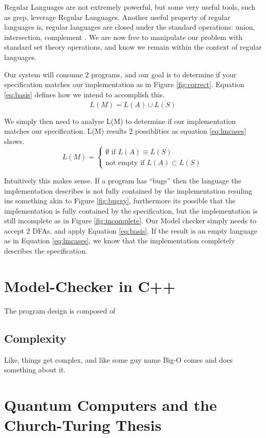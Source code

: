 \documentclass[12pt,journal,compsoc,draftcls]{IEEEtran}
\begin{document}
Regular Languages are not extremely powerful, but some very useful tools,
such as grep, leverage Regular Languages. Another useful property of regular
languages is, regular languages are closed under the standard operations: union,
intersection, complement \cite[p.~45]{Sipser}.  We are now free to manipulate
our problem with standard set theory operations, and know we remain within the
context of regular languages.  

Our system will consume 2 programs, and our goal is to determine if your
specification matches our implementation as in Figure \ref{fig:correct}.
Equation \ref{eq:basis} defines how we intend to accomplish this. 
\begin{equation}
L( M ) = L( A ) \cup \overline{L ( S ) } 
\label{eq:basis}
\end{equation}

We simply then need to analyse L(M) to determine if our implementation matches
our specification. L(M) results 2 possiblities as equation \ref{eq:lmcases}
shows.
\begin{equation}
    L(M) = 
    \begin{cases}
        \emptyset \text{ if } L(A) \equiv L(S)\\
        \text{not empty if } L(A) \subset L(S) 
    \end{cases}
    \label{eq:lmcases}
\end{equation}

Intuitively this makes sense.  If a program has ``bugs'' then the language the
implementation describes is not fully contained by the implementation resuling
ins something akin to Figure \ref{fig:buggy}, furthermore its possible that the
implementation is fully contained by the specification, but the implementation
is still incomplete as in Figure \ref{fig:incomplete}.  Our Model checker simply
needs to accept 2 DFAs, and apply Equation \ref{eq:basis}.  If the result is an
empty language as in Equation \ref{eq:lmcases}, we know that the implementation
completely describes the specification.

\section{Model-Checker in C++}
The program design is composed of 


\subsection{Complexity}
Like, things get complex, and like some guy name Big-O comes and does something
about it. 
\appendices
\section{Quantum Computers and the Church-Turing Thesis}


\end{document}
